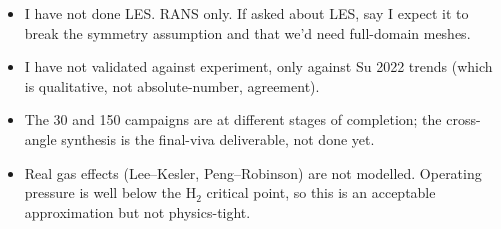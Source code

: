 \documentclass[11pt,a4paper]{article}
\begin{document}
\begin{itemize}[leftmargin=1.5em]
    \item I have not done LES. RANS only. If asked about LES, say I
    expect it to break the symmetry assumption and that we'd need
    full-domain meshes.
    \item I have not validated against experiment, only against
    Su 2022 trends (which is qualitative, not absolute-number, agreement).
    \item The 30\textdegree{} and 150\textdegree{} campaigns are at
    different stages of completion; the cross-angle synthesis is the
    final-viva deliverable, not done yet.
    \item Real gas effects (Lee--Kesler, Peng--Robinson) are not
    modelled. Operating pressure is well below the H$_2$ critical
    point, so this is an acceptable approximation but not physics-tight.
\end{itemize}
\end{document}
